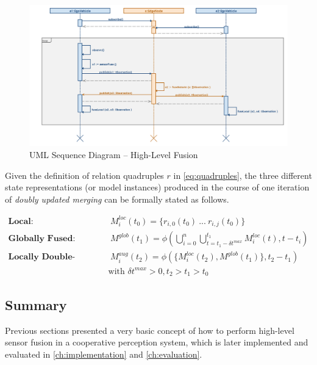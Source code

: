 \begin{figure}[H]
	\centering
	\includegraphics[width=1\linewidth]{98_images/sequence}
	\caption{UML Sequence Diagram – High-Level Fusion}
	\label{fig:sequence}
\end{figure}

Given the definition of relation quadruples $r$ in \cref{eq:quadruples}, the three different state representations (or model instances) produced in the course of one iteration of \textit{doubly updated merging} can be formally stated as follows.

\begin{align}
	\textbf{Local:\ } &\  M^{loc}_i(t_0) = \{ r_{i,0}(t_0)\ ...\ r_{i,j}(t_0)\} \\
	\textbf{Globally Fused:\ } &\  M^{glob}(t_1) = \phi(\bigcup^n_{i = 0} \bigcup^{t_1}_{t = t_1 - \delta t^{max}} M^{loc}_i(t), t-t_i) \\
	\textbf{Locally Double-Fused:\ } &\  M^{aug}_i(t_2) = \phi(\{ M^{loc}_i(t_2), M^{glob}(t_1) \}, t_2 - t_1)
\end{align}
\begin{gather*}
	\text{with\ } \delta t^{max} > 0, t_2 > t_1 > t_0
\end{gather*}

\subsection{Summary}
\label{subsec:concept_design:fusion_summary}
Previous sections presented a very basic concept of how to perform high-level sensor fusion in a cooperative perception system, which is later implemented and evaluated in \cref{ch:implementation} and \cref{ch:evaluation}. 

